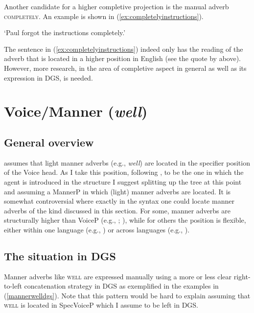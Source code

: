 Another candidate for a higher completive projection is the manual adverb \textsc{completely}. An example is shown in (\ref{ex:completelyinstructions}). 

\begin{exe}
\glt `Paul forgot the instructions completely.' \label{ex:completelyinstructions}
\end{exe} 

\noindent The sentence in (\ref{ex:completelyinstructions}) indeed only has the reading of the adverb that is located in a higher position in English (see the quote by \citealt[178]{cinque1999adverbs} above). However, more research, in the area of completive aspect in general as well as its expression in DGS, is needed.





\section{Voice/Manner (\textit{well})}

\subsection{General overview}
\citet[101--102]{cinque1999adverbs} assumes that light manner adverbs (e.g., \textit{well}) are located in the specifier position of the Voice head. As I take this position, following \citet{kratzer1996severing}, to be the one in which the agent is introduced in the structure I suggest splitting up the tree at this point and assuming a MannerP in which (light) manner adverbs are located. It is somewhat controversial where exactly in the syntax one could locate manner adverbs of the kind discussed in this section. For some, manner adverbs are structurally higher than VoiceP (e.g., \citealt{alexeyenko2012manner}; \citealt{cognola2013mixed}), while for others the position is flexible, either within one language (e.g., \citealt{haumann2007adverb}) or across languages (e.g., \citealt{kahnemuyipour2009syntax}). 

\subsection{The situation in DGS}
Manner adverbs like \textsc{well} are expressed manually using a more or less clear right-to-left concatenation strategy in DGS as exemplified in the examples in (\ref{mannerwelldgs}). Note that this pattern would be hard to explain assuming that \textsc{well} is located in SpecVoiceP which I assume to be left in DGS.

